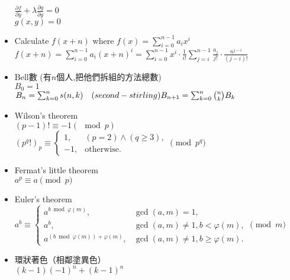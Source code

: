 \begin{itemize}
    $\frac{\partial f}{\partial y} + \lambda\frac{\partial g}{\partial y}=0$\\
    $g(x, y)=0$
  \item Calculate $f(x+n)$ where $f(x)=\sum\limits_{i=0}^{n-1}a_ix^i$\\
    $f(x+n)=\sum\limits_{i=0}^{n-1}a_i(x+n)^i=\sum\limits_{i=0}^{n-1}x^i\cdot\frac{1}{i!}\sum\limits_{j=i}^{n-1}\frac{a_j}{j!}\cdot\frac{n^{j-i}}{(j-i)!}$
  \item Bell數 (有$n$個人,把他們拆組的方法總數)\\
    $B_0= 1$\\
    $B_n= \sum_{k=0}^{n} s(n,k)\quad (second-stirling)\\
    B_{n+1}= \sum_{k=0}^{n}{n \choose k} B_k$
  \item Wilson's theorem\\
    $(p-1)! \equiv -1 (\mod p)$\\
    $(p^q!)_p\equiv \begin{cases} 1, & (p=2) \land (q\geq 3),\\ -1, & \text{otherwise}. \end{cases} \pmod p^q$
  \item Fermat's little theorem\\
    $a^p \equiv a \pmod p$
  \item Euler's theorem\\
    $a^b \equiv \begin{cases} a^{b \bmod \varphi(m)}, &\gcd(a,m) = 1, \\ a^b, &\gcd(a,m)\ne 1, b < \varphi(m), \\ a^{(b \bmod \varphi(m)) + \varphi(m)}, &\gcd(a,m)\ne 1, b \ge \varphi(m). \end{cases} \pmod m$
  \item 環狀著色（相鄰塗異色）\\
      $(k-1)(-1)^n+(k-1)^n$
  
\end{itemize}